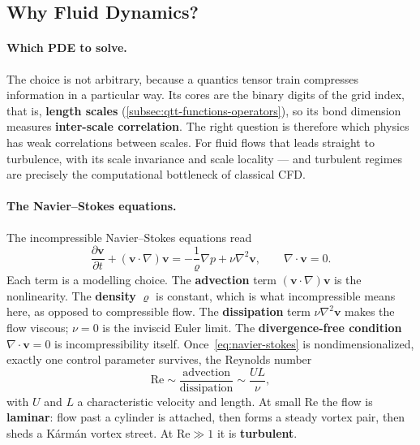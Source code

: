 \subsection{Why Fluid Dynamics?}
\label{subsec:why-fluid-dynamics}

\paragraph{Which PDE to solve.}
The choice is not arbitrary, because a quantics tensor train compresses
information in a particular way. Its cores are the binary digits of the grid
index, that is, \textbf{length scales} (\cref{subsec:qtt-functions-operators}),
so its bond dimension measures \textbf{inter-scale correlation}.
The right question is therefore which physics has weak
correlations between scales. For fluid flows that leads straight to turbulence,
with its scale invariance and scale locality --- and turbulent regimes are
precisely the computational bottleneck of classical CFD.

\paragraph{The Navier--Stokes equations.}
\label{subsec:navier-stokes}
The incompressible Navier--Stokes equations read
\begin{equation}
  \frac{\partial \mathbf{v}}{\partial t} + (\mathbf{v}\cdot\nabla)\mathbf{v}
    = -\frac{1}{\varrho}\nabla p + \nu \nabla^2 \mathbf{v},
  \qquad
  \nabla\cdot\mathbf{v} = 0 .
  \label{eq:navier-stokes}
\end{equation}
Each term is a modelling choice. The \textbf{advection} term
$(\mathbf{v}\cdot\nabla)\mathbf{v}$ is the nonlinearity. The \textbf{density}
$\varrho$ is constant, which is what incompressible means here, as opposed to
compressible flow. The \textbf{dissipation} term $\nu\nabla^2\mathbf{v}$ makes the
flow viscous; $\nu = 0$ is the inviscid Euler limit. The
\textbf{divergence-free condition} $\nabla\cdot\mathbf{v}=0$ is
incompressibility itself. Once~\eqref{eq:navier-stokes} is nondimensionalized,
exactly one control parameter survives, the Reynolds number
\begin{equation}
  \mathrm{Re} \sim \frac{\text{advection}}{\text{dissipation}}
    \sim \frac{UL}{\nu},
\end{equation}
with $U$ and $L$ a characteristic velocity and length. At small $\mathrm{Re}$
the flow is \textbf{laminar}: flow past a cylinder is attached, then forms a
steady vortex pair, then sheds a K\'arm\'an vortex street. At $\mathrm{Re} \gg 1$
it is \textbf{turbulent}.

